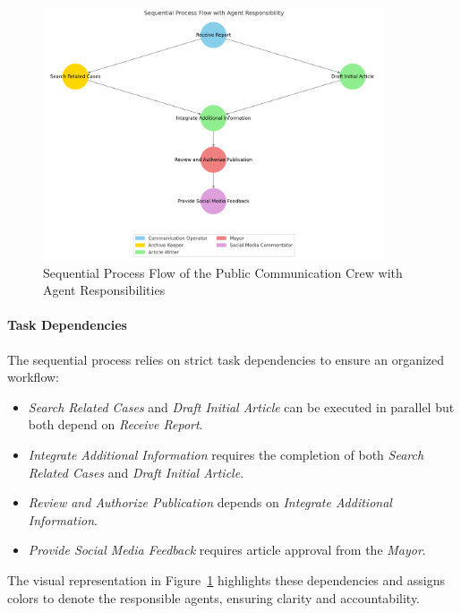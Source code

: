 \begin{figure}[h!]
	\centering
	\includegraphics[width=0.9\textwidth]{figures/PC-process.png}
	\caption{Sequential Process Flow of the Public Communication Crew with Agent Responsibilities}
	\label{fig:public_comm_flow}
\end{figure}


\paragraph{Task Dependencies}
The sequential process relies on strict task dependencies to ensure an organized workflow:
\begin{itemize}
	\item \textit{Search Related Cases} and \textit{Draft Initial Article} can be executed in parallel but both depend on \textit{Receive Report}.
	\item \textit{Integrate Additional Information} requires the completion of both \textit{Search Related Cases} and \textit{Draft Initial Article}.
	\item \textit{Review and Authorize Publication} depends on \textit{Integrate Additional Information}.
	\item \textit{Provide Social Media Feedback} requires article approval from the \textit{Mayor}.
\end{itemize}

The visual representation in Figure~\ref{fig:public_comm_flow} highlights these dependencies and assigns colors to denote the responsible agents, ensuring clarity and accountability.
